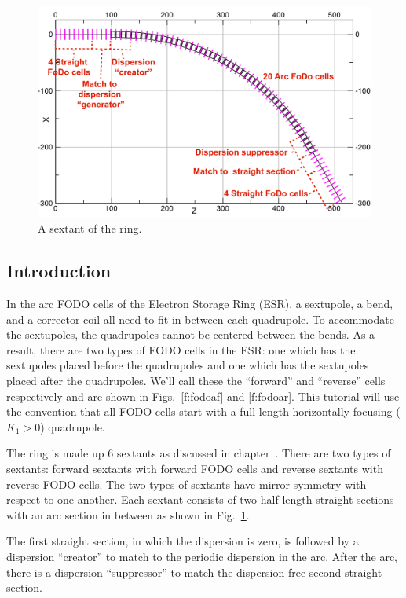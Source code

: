 \documentclass{hitec}     %
\begin{document}
\begin{figure}[!h]
  \centering
  \includegraphics[width=0.8\linewidth]{figures/sextant.pdf}
  \caption{A sextant of the ring.}
  \label{f:sextant0}
\end{figure}

\subsection{Introduction}

In the arc FODO cells of the Electron Storage Ring (ESR), a sextupole, a bend, and a corrector coil all need to fit in between each quadrupole. To accommodate the sextupoles, the quadrupoles cannot be centered between the bends. As a result, there are two types of FODO cells in the ESR: one which has the sextupoles placed before the quadrupoles and one which has the sextupoles placed after the quadrupoles. 
We'll call these the ``forward'' and ``reverse'' cells respectively and are shown in Figs.~\ref{f:fodoaf} and \ref{f:fodoar}. 
This tutorial will use the convention that all FODO cells start with a full-length horizontally-focusing ($K_1 >0$) quadrupole.

The ring is made up 6 sextants as discussed in chapter~.
There are two types of sextants: forward sextants with forward FODO cells and reverse sextants
with reverse FODO cells. The two types of sextants have mirror symmetry with respect to one another.
Each sextant consists of two half-length straight sections with an arc section in between as shown in
Fig.~\ref{f:sextant0}.

The first straight section, in which the dispersion is zero, is followed by a dispersion
``creator'' to match to the periodic dispersion in the arc. After the arc, there is a
dispersion ``suppressor'' to match the dispersion free second straight section. 
\end{document}
